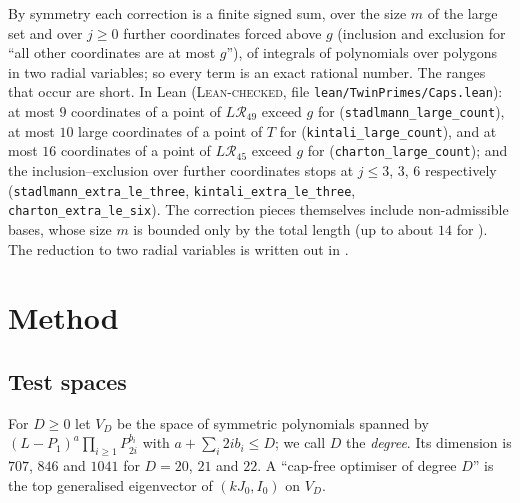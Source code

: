\documentclass[11pt]{amsart}
\theoremstyle{definition}
\theoremstyle{remark}
\newcommand{\lbl}[1]{\textup{\textsc{#1}}}
\newcommand{\R}{\mathcal{R}}
\begin{document}
By symmetry each correction is a finite signed sum, over the size $m$ of the
large set and over $j\ge0$ further coordinates forced above $g$ (inclusion and
exclusion for ``all other coordinates are at most $g$''), of integrals of
polynomials over polygons in two radial variables; so every term is an exact
rational number. The ranges that occur are short. In Lean
(\lbl{Lean-checked}, file \texttt{lean/TwinPrimes/Caps.lean}): at most $9$
coordinates of a point of $L\R_{49}$ exceed $g$ for \cite{Sta26}
(\texttt{stadlmann\_large\_count}), at most $10$ large coordinates of a point
of $T$ for \cite{Kin26} (\texttt{kintali\_large\_count}), and at most $16$
coordinates of a point of $L\R_{45}$ exceed $g$ for \cite{Cha26}
(\texttt{charton\_large\_count}); and the inclusion--exclusion over further
coordinates stops at $j\le3$, $3$, $6$ respectively
(\texttt{stadlmann\_extra\_le\_three}, \texttt{kintali\_extra\_le\_three},
\texttt{charton\_extra\_le\_six}). The correction pieces themselves include
non-admissible bases, whose size $m$ is bounded only by the total length (up
to about $14$ for \cite{Kin26}). The reduction to two radial variables is
written out in \cite[\S5]{Kim26}.

\section{Method}

\subsection*{Test spaces}
For $D\ge0$ let $V_D$ be the space of symmetric polynomials spanned by
$(L-P_1)^a\prod_{i\ge1}P_{2i}^{b_i}$ with $a+\sum_i2ib_i\le D$; we call $D$
the \emph{degree}. Its dimension is $707$, $846$ and $1041$ for $D=20$, $21$
and $22$. A ``cap-free optimiser of degree $D$'' is the top generalised
eigenvector of $(kJ_0,I_0)$ on $V_D$.
\end{document}
